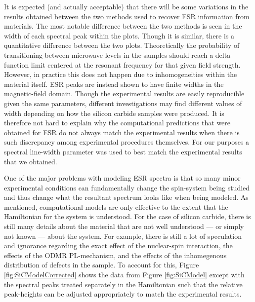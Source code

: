 \documentclass[oneside, noacknowlegments]{BYUPhys}
\begin{document}
It is expected (and actually acceptable) that there will be some variations in the results obtained between the two methods used to recover ESR information from materials. The most notable difference between the two methods is seen in the width of each spectral peak within the plots. Though it is similar, there is a quantitative difference between the two plots. Theoretically the probability of transitioning between microwave-levels in the samples should reach a delta-function limit centered at the resonant frequency for that given field strength. However, in practice this does not happen due to inhomogeneities within the material itself. ESR peaks are instead shown to have finite widths in the magnetic-field domain. Though the experimental results are easily reproducible given the same parameters, different investigations may find different values of width depending on how the silicon carbide samples were produced. It is therefore not hard to explain why the computational predictions that were obtained for ESR do not always match the experimental results when there is such discrepancy among experimental procedures themselves. For our purposes a spectral line-width parameter was used to best match the experimental results that we obtained.

One of the major problems with modeling ESR spectra is that so many minor experimental conditions can fundamentally change the spin-system being studied and thus change what the resultant spectrum looks like when being modeled. As mentioned, computational models are only effective to the extent that the Hamiltonian for the system is understood. For the case of silicon carbide, there is still many details about the material that are not well understood --- or simply not known --- about the system. For example, there is still a lot of speculation and ignorance regarding the exact effect of the nuclear-spin interaction, the effects of the ODMR PL-mechanism, and the effects of the inhomegenous distribution of defects in the sample. To account for this, Figure \ref{fig:SiCModelCorrected} shows the data from Figure \ref{fig:SiCModel} except with the spectral peaks treated separately in the Hamiltonian such that the relative peak-heights can be adjusted appropriately to match the experimental results.
\end{document}
